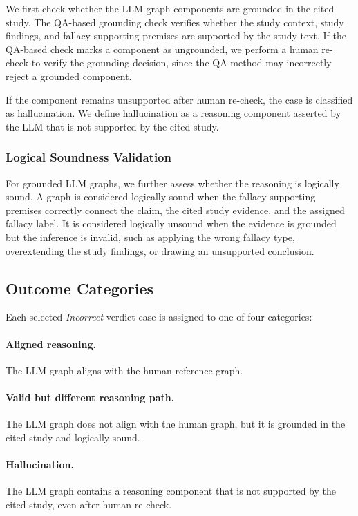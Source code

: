 \documentclass[11pt]{article}
\begin{document}
We first check whether the LLM graph components are grounded in the cited study. 
The QA-based grounding check verifies whether the study context, study findings, and fallacy-supporting premises are supported by the study text. 
If the QA-based check marks a component as ungrounded, we perform a human re-check to verify the grounding decision, since the QA method may incorrectly reject a grounded component.

If the component remains unsupported after human re-check, the case is classified as hallucination. 
We define hallucination as a reasoning component asserted by the LLM that is not supported by the cited study.

\subsubsection{Logical Soundness Validation}
\label{subsubsec:logical-soundness}

For grounded LLM graphs, we further assess whether the reasoning is logically sound. 
A graph is considered logically sound when the fallacy-supporting premises correctly connect the claim, the cited study evidence, and the assigned fallacy label. 
It is considered logically unsound when the evidence is grounded but the inference is invalid, such as applying the wrong fallacy type, overextending the study findings, or drawing an unsupported conclusion.

\subsection{Outcome Categories}
\label{subsec:outcome-categories}

Each selected \textit{Incorrect}-verdict case is assigned to one of four categories:

\paragraph{Aligned reasoning.}
The LLM graph aligns with the human reference graph.

\paragraph{Valid but different reasoning path.}
The LLM graph does not align with the human graph, but it is grounded in the cited study and logically sound.

\paragraph{Hallucination.}
The LLM graph contains a reasoning component that is not supported by the cited study, even after human re-check.
\end{document}
